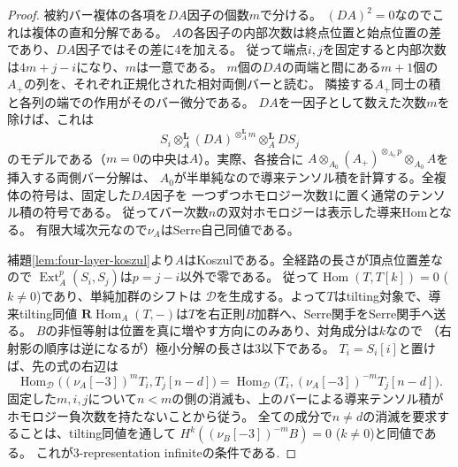 \begin{proof}
被約バー複体の各項を$DA$因子の個数$m$で分ける。
$(DA)^2=0$なのでこれは複体の直和分解である。
$A$の各因子の内部次数は終点位置と始点位置の差であり、$DA$因子ではその差に4を加える。
従って端点$i,j$を固定すると内部次数は$4m+j-i$になり、$m$は一意である。
$m$個の$DA$の両端と間にある$m+1$個の$A_+$の列を、それぞれ正規化された相対両側バーと読む。
隣接する$A_+$同士の積と各列の端での作用がそのバー微分である。
$DA$を一因子として数えた次数$m$を除けば、これは
\[
 S_i\otimes_A^{\mathbf L}(DA)^{\otimes_A^{\mathbf L}m}
       \otimes_A^{\mathbf L}D S_j
\]
のモデルである（$m=0$の中央は$A$）。実際、各接合に
$A\otimes_{A_0}(A_+)^{\otimes_{A_0}p}\otimes_{A_0}A$を挿入する両側バー分解は、
$A_0$が半単純なので導来テンソル積を計算する。全複体の符号は、固定した$DA$因子を
一つずつホモロジー次数1に置く通常のテンソル積の符号である。
従ってバー次数$n$の双対ホモロジーは表示した導来Homとなる。
有限大域次元なので$\nu_A$はSerre自己同値である。

補題\ref{lem:four-layer-koszul}より$A$はKoszulである。全経路の長さが頂点位置差なので
$\operatorname{Ext}^p_A(S_i,S_j)$は$p=j-i$以外で零である。
従って$\operatorname{Hom}(T,T[k])=0$ ($k\ne0$)であり、単純加群のシフトは
$\mathcal D$を生成する。よって$T$はtilting対象で、導来tilting同値
$\mathbf R\operatorname{Hom}_A(T,-)$は$T$を右正則$B$加群へ、Serre関手をSerre関手へ送る。
$B$の非恒等射は位置を真に増やす方向にのみあり、対角成分は$k$なので
（右射影の順序は逆になるが）極小分解の長さは3以下である。
$T_i=S_i[i]$と置けば、先の式の右辺は
\[
 \operatorname{Hom}_{\mathcal D}\bigl((\nu_A[-3])^m T_i,
                                      T_j[n-d]\bigr)
 =\operatorname{Hom}_{\mathcal D}\bigl(T_i,(\nu_A[-3])^{-m}T_j[n-d]\bigr).
\]
固定した$m,i,j$について$n<m$の側の消滅も、上のバーによる導来テンソル積が
ホモロジー負次数を持たないことから従う。
全ての成分で$n\ne d$の消滅を要求することは、tilting同値を通して
$H^k((\nu_B[-3])^{-m}B)=0$ ($k\ne0$)と同値である。
これが3-representation infiniteの条件である\cite{HIOrep,GrantIyama}.
\end{proof}

